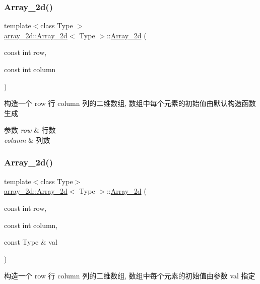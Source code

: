 \subsubsection{\texorpdfstring{Array\+\_\+2d()}{Array\_2d()}\hspace{0.1cm}{\footnotesize\ttfamily [2/4]}}
{\footnotesize\ttfamily template$<$class Type $>$ \\
\hyperlink{classarray__2d_1_1_array__2d}{array\+\_\+2d\+::\+Array\+\_\+2d}$<$ Type $>$\+::\hyperlink{classarray__2d_1_1_array__2d}{Array\+\_\+2d} (\begin{DoxyParamCaption}\item[{const int}]{row,  }\item[{const int}]{column }\end{DoxyParamCaption})}



构造一个 row 行 column 列的二维数组, 数组中每个元素的初始值由默认构造函数生成 


\begin{DoxyParams}{参数}
{\em row} & 行数 \\
\hline
{\em column} & 列数 \\
\hline
\end{DoxyParams}
\mbox{\label{classarray__2d_1_1_array__2d_aae6ad90ad3b5f3549be4df81a8559ef6}} 
\subsubsection{\texorpdfstring{Array\+\_\+2d()}{Array\_2d()}\hspace{0.1cm}{\footnotesize\ttfamily [3/4]}}
{\footnotesize\ttfamily template$<$class Type$>$ \\
\hyperlink{classarray__2d_1_1_array__2d}{array\+\_\+2d\+::\+Array\+\_\+2d}$<$ Type $>$\+::\hyperlink{classarray__2d_1_1_array__2d}{Array\+\_\+2d} (\begin{DoxyParamCaption}\item[{const int}]{row,  }\item[{const int}]{column,  }\item[{const Type \&}]{val }\end{DoxyParamCaption})}



构造一个 row 行 column 列的二维数组, 数组中每个元素的初始值由参数 val 指定 


